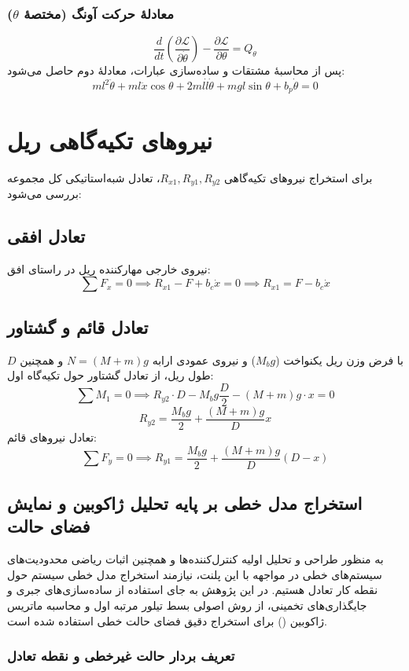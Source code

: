 \subsubsection{معادلهٔ حرکت آونگ (مختصهٔ $\theta$)}
\[
    \frac{d}{dt}\left(\frac{\partial \mathcal{L}}{\partial \dot{\theta}}\right) - \frac{\partial \mathcal{L}}{\partial \theta} = Q_\theta
\]
پس از محاسبهٔ مشتقات و ساده‌سازی عبارات، معادلهٔ دوم حاصل می‌شود:
\[
    ml^2\ddot{\theta} + ml\ddot{x}\cos\theta + 2ml\dot{l}\dot{\theta} + mgl\sin\theta + b_p\dot{\theta} = 0
\]
\section{نیروهای تکیه‌گاهی ریل}

برای استخراج نیروهای تکیه‌گاهی $R_{x1}, R_{y1}, R_{y2}$، تعادل شبه‌استاتیکی کل مجموعه بررسی می‌شود:

\subsection{تعادل افقی}
نیروی خارجی مهارکننده ریل در راستای افق:
\[
    \sum F_x = 0 \implies R_{x1} - F + b_c\dot{x} = 0 \implies R_{x1} = F - b_c\dot{x}
\]

\subsection{تعادل قائم و گشتاور}
با فرض وزن ریل یکنواخت ($M_b g$) و نیروی عمودی ارابه $N = (M+m)g$ و همچنین $D$ طول ریل، از تعادل گشتاور حول تکیه‌گاه اول:
\[
    \sum M_1 = 0 \implies R_{y2} \cdot D - M_b g \frac{D}{2} - (M+m)g \cdot x = 0
\]
\[
    R_{y2} = \frac{M_b g}{2} + \frac{(M+m)g}{D} x
\]
تعادل نیروهای قائم:
\[
    \sum F_y = 0 \implies R_{y1} = \frac{M_b g}{2} + \frac{(M+m)g}{D} (D-x)
\]
\subsection{استخراج مدل خطی بر پایه تحلیل ژاکوبین و نمایش فضای حالت}

به منظور طراحی و تحلیل اولیه کنترل‌کننده‌ها و همچنین اثبات ریاضی محدودیت‌های سیستم‌های خطی در مواجهه با این پلنت، نیازمند استخراج مدل خطی سیستم حول نقطه کار تعادل هستیم. در این پژوهش به جای استفاده از ساده‌سازی‌های جبری و جایگذاری‌های تخمینی، از روش اصولی بسط تیلور مرتبه اول و محاسبه ماتریس ژاکوبین () برای استخراج دقیق فضای حالت خطی استفاده شده است.

\subsubsection{تعریف بردار حالت غیرخطی و نقطه تعادل}

